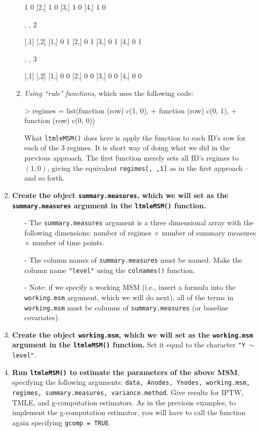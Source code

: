 \documentclass[answers]{exam}
\begin{document}
\begin{enumerate}
\begin{enumerate}
\begin{Schunk}
\begin{Soutput}
     [,1] [,2]
[1,]    1    0
[2,]    1    0
[3,]    1    0
[4,]    1    0

, , 2

     [,1] [,2]
[1,]    0    1
[2,]    0    1
[3,]    0    1
[4,]    0    1

, , 3

     [,1] [,2]
[1,]    0    0
[2,]    0    0
[3,]    0    0
[4,]    0    0
\end{Soutput}
\end{Schunk}
\item \textit{Using ``rule" functions,} which uses the following code: 
\begin{Schunk}
\begin{Sinput}
> regimes = list(function (row) c(1, 0),
+                function (row) c(0, 1),
+                function (row) c(0, 0))
\end{Sinput}
\end{Schunk}
What \texttt{ltmleMSM()} does here is apply the function to each ID's row for each of the 3 regimes. It is short way of doing what we did in the previous approach. The first function merely sets all ID's regimes to $(1,0)$, giving the equivalent \texttt{regimes[, ,1]} as in the first approach -- and so forth.
\end{enumerate}
\item \textbf{Create the object \texttt{summary.measures}, which we will set as the \texttt{summary.measures} argument in the \texttt{ltmleMSM()} function.} 
\begin{itemize}
\item[-] The \texttt{summary.measures} argument is a three dimensional array with the following dimensions: number of regimes $\times$ number of summary measures $\times$ number of time points. 
\item[-] The column names of \texttt{summary.measures} must be named. Make the column name \texttt{"level"} using the \texttt{colnames()} function.
\item[-] Note: if we specify a working MSM (i.e., insert a formula into the \texttt{working.msm} argument, which we will do next), all of the terms in \texttt{working.msm} must be columns of \texttt{summary.measures} (or baseline covariates). 
\end{itemize}
\item \textbf{Create the object \texttt{working.msm}, which we will set as the \texttt{working.msm} argument in the \texttt{ltmleMSM()} function.} Set it equal to the character \texttt{"Y $\sim$ level"}.
\item \textbf{Run \texttt{ltmleMSM()} to estimate the parameters of the above MSM}, specifying the following arguments: \texttt{data, Anodes, Ynodes, working.msm, regimes, summary.measures, variance.method}. Give results for IPTW, TMLE, and g-computation estimators. As in the previous examples, to implement the g-computation estimator, you will have to call the function again specifying \texttt{gcomp = TRUE}.
\end{enumerate}
\end{document}
